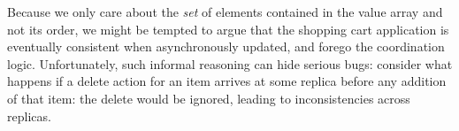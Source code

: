 
Because we only care about the \emph{set} of elements contained in the value array
and not its order, we might be tempted to argue that 
the shopping cart application is eventually consistent
when asynchronously updated, and forego the coordination logic.  Unfortunately, such informal reasoning can hide serious bugs: consider what happens if a delete action for an item arrives at some replica
before any addition of that item: the delete would be ignored, leading to inconsistencies across replicas.

